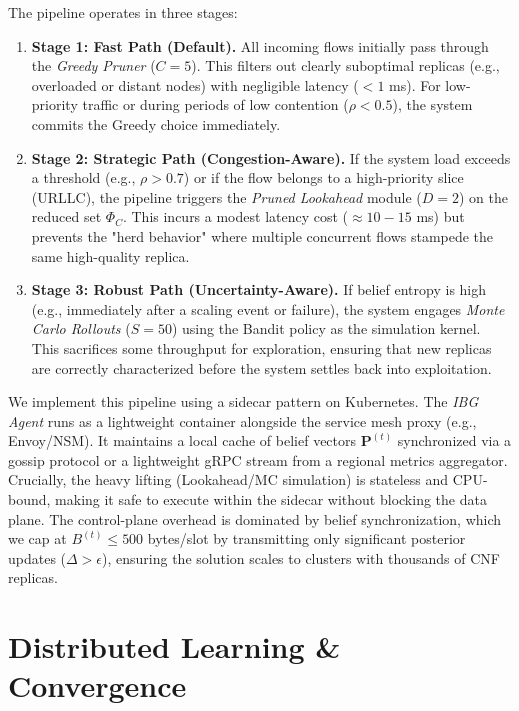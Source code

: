 \documentclass[journal]{IEEEtran}
\theoremstyle{plain}
\theoremstyle{definition}
\theoremstyle{remark}
\begin{document}
The pipeline operates in three stages:
\begin{enumerate}
    \item \textbf{Stage 1: Fast Path (Default).} All incoming flows initially pass through the \textit{Greedy Pruner} ($C=5$). This filters out clearly suboptimal replicas (e.g., overloaded or distant nodes) with negligible latency ($<1$ ms). For low-priority traffic or during periods of low contention ($\rho < 0.5$), the system commits the Greedy choice immediately.
    
    \item \textbf{Stage 2: Strategic Path (Congestion-Aware).} If the system load exceeds a threshold (e.g., $\rho > 0.7$) or if the flow belongs to a high-priority slice (URLLC), the pipeline triggers the \textit{Pruned Lookahead} module ($D=2$) on the reduced set $\Phi_C$. This incurs a modest latency cost ($\approx 10-15$ ms) but prevents the "herd behavior" where multiple concurrent flows stampede the same high-quality replica.
    
    \item \textbf{Stage 3: Robust Path (Uncertainty-Aware).} If belief entropy is high (e.g., immediately after a scaling event or failure), the system engages \textit{Monte Carlo Rollouts} ($S=50$) using the Bandit policy as the simulation kernel. This sacrifices some throughput for exploration, ensuring that new replicas are correctly characterized before the system settles back into exploitation.
\end{enumerate}

We implement this pipeline using a sidecar pattern on Kubernetes. The \textit{IBG Agent} runs as a lightweight container alongside the service mesh proxy (e.g., Envoy/NSM). It maintains a local cache of belief vectors $\mathbf{P}^{(t)}$ synchronized via a gossip protocol or a lightweight gRPC stream from a regional metrics aggregator. 
Crucially, the heavy lifting (Lookahead/MC simulation) is stateless and CPU-bound, making it safe to execute within the sidecar without blocking the data plane. The control-plane overhead is dominated by belief synchronization, which we cap at $B^{(t)} \le 500$ bytes/slot by transmitting only significant posterior updates ($\Delta > \epsilon$), ensuring the solution scales to clusters with thousands of CNF replicas.



\section{Distributed Learning \& Convergence}
\label{sec:learning}
\end{document}
